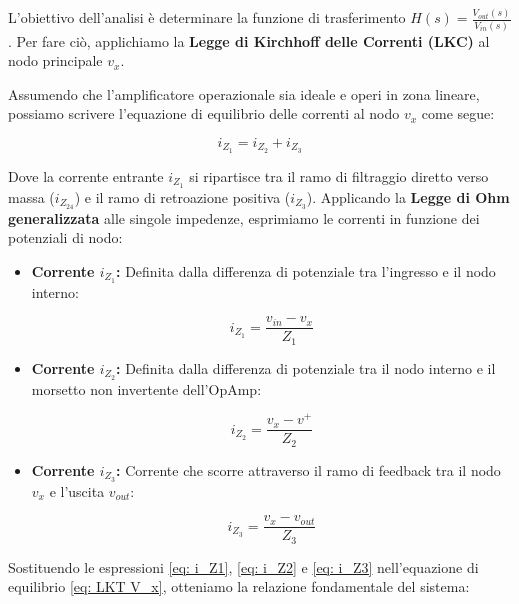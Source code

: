 L'obiettivo dell'analisi è determinare la funzione di trasferimento $H(s) = \frac{V_{out}(s)}{V_{in}(s)}$. Per fare ciò, applichiamo la \textbf{Legge di Kirchhoff delle Correnti (LKC)} al nodo principale $v_x$. 

\SallenKeyZ
Assumendo che l'amplificatore operazionale sia ideale e operi in zona lineare, possiamo scrivere l'equazione di equilibrio delle correnti al nodo $v_x$ come segue:

\begin{equation}
    i_{Z_1} = i_{Z_2} + i_{Z_3}
    \label{eq: LKT V_x}
\end{equation}

Dove la corrente entrante $i_{Z_1}$ si ripartisce tra il ramo di filtraggio diretto verso massa ($i_{Z_{24}}$) e il ramo di retroazione positiva ($i_{Z_3}$). Applicando la \textbf{Legge di Ohm generalizzata} alle singole impedenze, esprimiamo le correnti in funzione dei potenziali di nodo:

\begin{itemize}
    \item \textbf{Corrente $i_{Z_1}$:} Definita dalla differenza di potenziale tra l'ingresso e il nodo interno:

    \begin{equation}
        i_{Z_1} = \frac{v_{in} - v_x}{Z_1}
        \label{eq: i_Z1}
    \end{equation}

    \item \textbf{Corrente $i_{Z_2}$:} Definita dalla differenza di potenziale tra il nodo interno e il morsetto non invertente dell'OpAmp:

    \begin{equation}
        i_{Z_2} = \frac{v_x - v^+}{Z_2}
        \label{eq: i_Z2}
    \end{equation}

    \item \textbf{Corrente $i_{Z_3}$:} Corrente che scorre attraverso il ramo di feedback tra il nodo $v_x$ e l'uscita $v_{out}$:

    \begin{equation}
        i_{Z_3} = \frac{v_x - v_{out}}{Z_3}
        \label{eq: i_Z3}
    \end{equation}
\end{itemize}
Sostituendo le espressioni \ref{eq: i_Z1}, \ref{eq: i_Z2} e \ref{eq: i_Z3} nell'equazione di equilibrio \ref{eq: LKT V_x}, otteniamo la relazione fondamentale del sistema:

